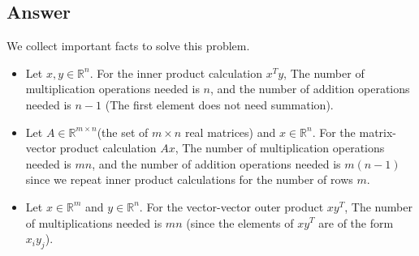 \documentclass[
	12pt, %
]{../Template/fphw}
\begin{document}
\subsection*{Answer}
We collect important facts to solve this problem.
\begin{itemize}
    \item Let $x,y\in \mathbb{R}^n$. For the inner product calculation $x^T y$, The number of multiplication operations needed is $n$, and the number of addition operations needed is $n-1$ (The first element does not need summation).
    \item Let $A\in \mathbb{R}^{m\times n}$(the set of $m\times n$ real matrices) and $x\in \mathbb{R}^n$. For the matrix-vector product calculation $Ax$, The number of multiplication operations needed is $mn$, and the number of addition operations needed is $m(n-1)$ since we repeat inner product calculations for the number of rows $m$.
    \item Let $x\in \mathbb{R}^{m}$ and $y\in \mathbb{R}^{n}$. For the vector-vector outer product $xy^{T}$, The number of multiplications needed is $mn$ (since the elements of $xy^T$ are of the form $x_i y_j$).
\end{itemize}
\end{document}
